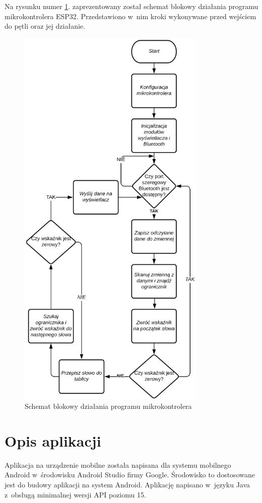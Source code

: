 \documentclass[a4paper,12pt, twoside]{article}
\begin{document}
    	Na rysunku numer \ref{fig:petlamikrokontrolera}. zaprezentowany został schemat blokowy działania programu mikrokontrolera ESP32. Przedstawiono w~nim kroki wykonywane przed wejściem do pętli oraz jej działanie.
    	\begin{figure}[H]
    	        \centering
    			\includegraphics[width=9cm]{images/schemat_petli_mikrokontrolera.png}
    			\caption{Schemat blokowy działania programu mikrokontrolera}
                \label{fig:petlamikrokontrolera}
    	\end{figure}
    	
    	\section{Opis aplikacji}
    	Aplikacja na urządzenie mobilne została napisana dla systemu mobilnego Android w~środowisku Android Studio firmy Google. Środowisko to dostosowane jest do budowy aplikacji na system Android. Aplikację napisano w~języku Java z~obsługą minimalnej wersji API poziomu 15.
    	
\end{document}

